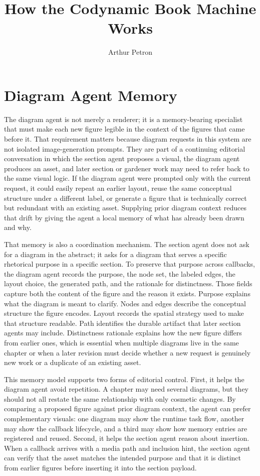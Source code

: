 \documentclass[11pt]{article}
\title{How the Codynamic Book Machine Works}
\author{Arthur Petron}
\begin{document}
\section*{Diagram Agent Memory}

The diagram agent is not merely a renderer; it is a memory-bearing specialist that must make each new figure legible in the context of the figures that came before it. That requirement matters because diagram requests in this system are not isolated image-generation prompts. They are part of a continuing editorial conversation in which the section agent proposes a visual, the diagram agent produces an asset, and later section or gardener work may need to refer back to the same visual logic. If the diagram agent were prompted only with the current request, it could easily repeat an earlier layout, reuse the same conceptual structure under a different label, or generate a figure that is technically correct but redundant with an existing asset. Supplying prior diagram context reduces that drift by giving the agent a local memory of what has already been drawn and why.

That memory is also a coordination mechanism. The section agent does not ask for a diagram in the abstract; it asks for a diagram that serves a specific rhetorical purpose in a specific section. To preserve that purpose across callbacks, the diagram agent records the purpose, the node set, the labeled edges, the layout choice, the generated path, and the rationale for distinctness. Those fields capture both the content of the figure and the reason it exists. Purpose explains what the diagram is meant to clarify. Nodes and edges describe the conceptual structure the figure encodes. Layout records the spatial strategy used to make that structure readable. Path identifies the durable artifact that later section agents may include. Distinctness rationale explains how the new figure differs from earlier ones, which is essential when multiple diagrams live in the same chapter or when a later revision must decide whether a new request is genuinely new work or a duplicate of an existing asset.

This memory model supports two forms of editorial control. First, it helps the diagram agent avoid repetition. A chapter may need several diagrams, but they should not all restate the same relationship with only cosmetic changes. By comparing a proposed figure against prior diagram context, the agent can prefer complementary visuals: one diagram may show the runtime task flow, another may show the callback lifecycle, and a third may show how memory entries are registered and reused. Second, it helps the section agent reason about insertion. When a callback arrives with a media path and inclusion hint, the section agent can verify that the asset matches the intended purpose and that it is distinct from earlier figures before inserting it into the section payload.
\end{document}
